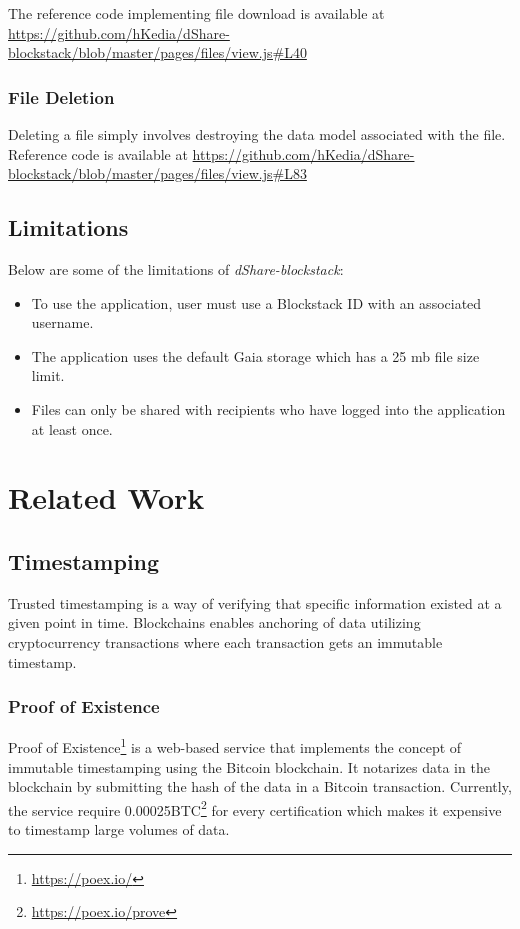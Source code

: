 				The reference code implementing file download is available at \url{https://github.com/hKedia/dShare-blockstack/blob/master/pages/files/view.js#L40}
			
			\subsubsection{File Deletion}
				Deleting a file simply involves destroying the data model associated with the file. Reference code is available at \url{https://github.com/hKedia/dShare-blockstack/blob/master/pages/files/view.js#L83}
			
		\subsection{Limitations}
			Below are some of the limitations of \textit{dShare-blockstack}:
			
			\begin{itemize}
				\item To use the application, user must use a Blockstack ID with an associated username.
				\item The application uses the default Gaia storage which has a 25 mb file size limit.
				\item Files can only be shared with recipients who have logged into the application at least once.
			\end{itemize}
		
	\section{Related Work}
		\subsection{Timestamping}
			Trusted timestamping is a way of verifying that specific information existed at a given point in time. Blockchains enables anchoring of data utilizing cryptocurrency transactions where each transaction gets an immutable timestamp.
			
				\subsubsection{Proof of Existence}
				Proof of Existence\footnote{\url{https://poex.io/}} is a web-based service that implements the concept of immutable timestamping using the Bitcoin blockchain. It notarizes data in the blockchain by submitting the hash of the data in a Bitcoin transaction. Currently, the service require 0.00025BTC\footnote{\url{https://poex.io/prove}} for every certification which makes it expensive to timestamp large volumes of data.
				
